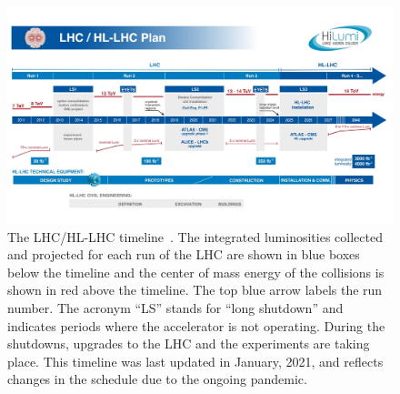\begin{figure}
    \centering
    \includegraphics[width = \textwidth]{figures/HL-LHC-updated-January-2021_small.jpg}
    \caption{The LHC/HL-LHC timeline~\cite{hl-lhc_plan_picture_website}. The integrated luminosities collected and projected for each run of the LHC are shown in blue boxes below the timeline and the center of mass energy of the collisions is shown in red above the timeline. The top blue arrow labels the run number. The acronym ``LS'' stands for ``long shutdown'' and indicates periods where the accelerator is not operating. During the shutdowns, upgrades to the LHC and the experiments are taking place. This timeline was last updated in January, 2021, and reflects changes in the schedule due to the ongoing pandemic. }
    \label{fig:hl-lhc}
\end{figure}



